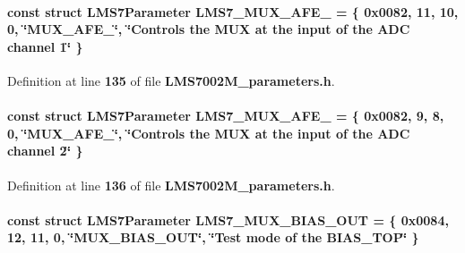 \paragraph[{L\+M\+S7\+\_\+\+M\+U\+X\+\_\+\+A\+F\+E\+\_\+1}]{\setlength{\rightskip}{0pt plus 5cm}const struct {\bf L\+M\+S7\+Parameter} L\+M\+S7\+\_\+\+M\+U\+X\+\_\+\+A\+F\+E\+\_ = \{ 0x0082, 11, 10, 0, \char`\"{}\+M\+U\+X\+\_\+\+A\+F\+E\+\_\char`\"{}, \char`\"{}\+Controls the M\+U\+X at the input of the A\+D\+C channel 1\char`\"{} \}\hspace{0.3cm}{\ttfamily [static]}}\label{LMS7002M__parameters_8h_a1558470322e27d6728c8bd2ade4906d0}


Definition at line {\bf 135} of file {\bf L\+M\+S7002\+M\+\_\+parameters.\+h}.

\paragraph[{L\+M\+S7\+\_\+\+M\+U\+X\+\_\+\+A\+F\+E\+\_\+2}]{\setlength{\rightskip}{0pt plus 5cm}const struct {\bf L\+M\+S7\+Parameter} L\+M\+S7\+\_\+\+M\+U\+X\+\_\+\+A\+F\+E\+\_ = \{ 0x0082, 9, 8, 0, \char`\"{}\+M\+U\+X\+\_\+\+A\+F\+E\+\_\char`\"{}, \char`\"{}\+Controls the M\+U\+X at the input of the A\+D\+C channel 2\char`\"{} \}\hspace{0.3cm}{\ttfamily [static]}}\label{LMS7002M__parameters_8h_a10f2b0b517ff61e22b00e73a9001f7d2}


Definition at line {\bf 136} of file {\bf L\+M\+S7002\+M\+\_\+parameters.\+h}.

\paragraph[{L\+M\+S7\+\_\+\+M\+U\+X\+\_\+\+B\+I\+A\+S\+\_\+\+O\+UT}]{\setlength{\rightskip}{0pt plus 5cm}const struct {\bf L\+M\+S7\+Parameter} L\+M\+S7\+\_\+\+M\+U\+X\+\_\+\+B\+I\+A\+S\+\_\+\+O\+UT = \{ 0x0084, 12, 11, 0, \char`\"{}\+M\+U\+X\+\_\+\+B\+I\+A\+S\+\_\+\+O\+U\+T\char`\"{}, \char`\"{}\+Test mode of the B\+I\+A\+S\+\_\+\+T\+O\+P\char`\"{} \}\hspace{0.3cm}{\ttfamily [static]}}\label{LMS7002M__parameters_8h_abcd55cc0e4e517d5c2e0bd9d458ab65f}


